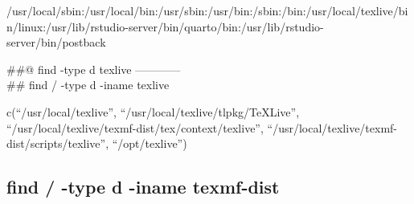 \documentclass[
]{article}
\newenvironment{Shaded}{\begin{snugshade}}{\end{snugshade}}
\newcommand{\AttributeTok}[1]{\textcolor[rgb]{0.13,0.29,0.53}{#1}}
\newcommand{\ConstantTok}[1]{\textcolor[rgb]{0.56,0.35,0.01}{#1}}
\newcommand{\ControlFlowTok}[1]{\textcolor[rgb]{0.13,0.29,0.53}{\textbf{#1}}}
\newcommand{\DecValTok}[1]{\textcolor[rgb]{0.00,0.00,0.81}{#1}}
\newcommand{\FunctionTok}[1]{\textcolor[rgb]{0.13,0.29,0.53}{\textbf{#1}}}
\newcommand{\NormalTok}[1]{#1}
\newcommand{\SpecialCharTok}[1]{\textcolor[rgb]{0.81,0.36,0.00}{\textbf{#1}}}
\newcommand{\StringTok}[1]{\textcolor[rgb]{0.31,0.60,0.02}{#1}}
\begin{document}
/usr/local/sbin:/usr/local/bin:/usr/sbin:/usr/bin:/sbin:/bin:/usr/local/texlive/bin/linux:/usr/lib/rstudio-server/bin/quarto/bin:/usr/lib/rstudio-server/bin/postback

\#\#@ find -type d texlive ------------\\
\#\# find / -type d -iname texlive

\begin{Shaded}
\end{Shaded}

c(``/usr/local/texlive'', ``/usr/local/texlive/tlpkg/TeXLive'',
``/usr/local/texlive/texmf-dist/tex/context/texlive'',
``/usr/local/texlive/texmf-dist/scripts/texlive'', ``/opt/texlive'')

\hypertarget{find--type-d--iname-texmf-dist}{%
\subsection{find / -type d -iname
texmf-dist}\label{find--type-d--iname-texmf-dist}}
\end{document}
